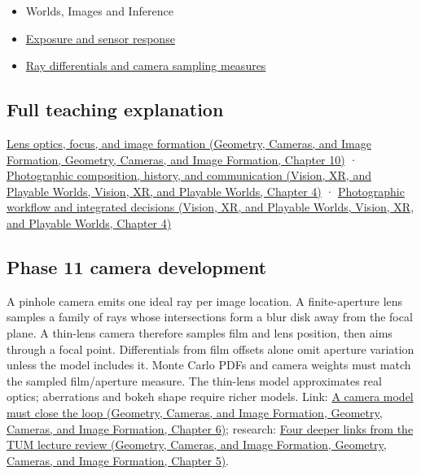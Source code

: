 \begin{itemize}
\item
  {Worlds, Images and Inference}
\item
  \hyperref[appendix-92d45cdf2afc]{Exposure and sensor response}
\item
  \hyperref[appendix-8c40fad29462]{Ray differentials and camera sampling measures}
\end{itemize}

\subsection{Full teaching explanation}\label{appendix-21f8456e2629-full-teaching-explanation}

\href{../03-Geometry-Cameras-and-Image-Formation/main.pdf\#nameddest=03-visual-computing-i-ch003-lens-optics-focus-and-image-formation}{Lens optics, focus, and image formation (Geometry, Cameras, and Image Formation, Geometry, Cameras, and Image Formation, Chapter 10)} · \href{../07-Vision-XR-and-Playable-Worlds/main.pdf\#nameddest=04-visual-computing-ii-ch034-photographic-composition-history-and-communication}{Photographic composition, history, and communication (Vision, XR, and Playable Worlds, Vision, XR, and Playable Worlds, Chapter 4)} · \href{../07-Vision-XR-and-Playable-Worlds/main.pdf\#nameddest=04-visual-computing-ii-ch034-photographic-workflow-and-integrated-decisions}{Photographic workflow and integrated decisions (Vision, XR, and Playable Worlds, Vision, XR, and Playable Worlds, Chapter 4)}

\subsection{Phase 11 camera development}\label{appendix-21f8456e2629-phase-11-camera-development}

A pinhole camera emits one ideal ray per image location. A finite-aperture lens samples a family of rays whose intersections form a blur disk away from the focal plane. A thin-lens camera therefore samples film and lens position, then aims through a focal point. Differentials from film offsets alone omit aperture variation unless the model includes it. Monte Carlo PDFs and camera weights must match the sampled film/aperture measure. The thin-lens model approximates real optics; aberrations and bokeh shape require richer models. Link: \href{../03-Geometry-Cameras-and-Image-Formation/main.pdf\#nameddest=02-foundations-ii-ch037-a-camera-model-must-close-the-loop}{A camera model must close the loop (Geometry, Cameras, and Image Formation, Geometry, Cameras, and Image Formation, Chapter 6)}; research: \href{../03-Geometry-Cameras-and-Image-Formation/main.pdf\#nameddest=02-foundations-ii-ch036-four-deeper-links-from-the-tum-lecture-review}{Four deeper links from the TUM lecture review (Geometry, Cameras, and Image Formation, Geometry, Cameras, and Image Formation, Chapter 5)}.
